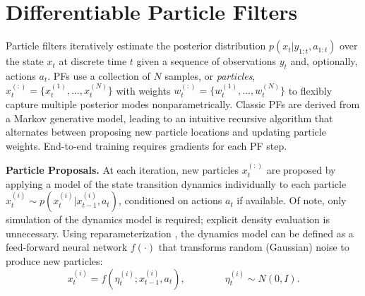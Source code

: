 


\section{Differentiable Particle Filters} \label{sec:diffy_pf}

    Particle filters iteratively estimate the posterior distribution $p(x_t |y_{1:t}, a_{1:t})$ over the state $x_t$ at discrete time $t$ given a sequence of observations $y_{t}$ and, optionally, actions $a_{t}$. PFs use a collection of $N$ samples, or \emph{particles}, $x_t^{(:)} = \{ x_t^{(1)}, ..., x_t^{(N)} \}$ with weights $w_t^{(:)} = \{ w_t^{(1)}, ..., w_t^{(N)} \}$ to flexibly capture multiple posterior modes nonparametrically. Classic PFs are derived from a Markov generative model, %
    leading to an intuitive recursive algorithm that alternates between proposing new particle locations and updating particle weights. End-to-end training requires gradients for each PF step. %

    \textbf{Particle Proposals.} At each iteration, new particles $x_t^{(:)}$ are proposed by applying a model of the state transition dynamics individually to each particle $x_t^{(i)} \sim p(x_t^{(i)} | x_{t-1}^{(i)}, a_t)$, conditioned on actions $a_t$ if available.
    Of note, only simulation of the dynamics model is required; explicit density evaluation is unnecessary.  %
    Using reparameterization \cite{mnih14amortized,kingma14,rezende14vae}, the dynamics model can be defined as a feed-forward neural network $f(\cdot)$ that transforms random (Gaussian) noise to produce new particles:
    \begin{equation}
        x_{t}^{(i)} = f(\eta_t^{(i)}; x_{t-1}^{(i)}, a_t),  \qquad\qquad \eta_t^{(i)} \sim N(0,I).
            \label{eqn:dynamics_model_learned}
    \end{equation}	 


